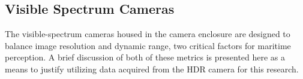 \documentclass{erauthesis}
\begin{document}











\subsection{Visible Spectrum Cameras} \label{visual_cameras}

The visible-spectrum cameras housed in the camera enclosure are designed to balance image resolution and dynamic range, two critical factors for maritime perception.
A brief discussion of both of these metrics is presented here as a means to justify utilizing data acquired from the \ac{HDR} camera for this research.
\end{document}
